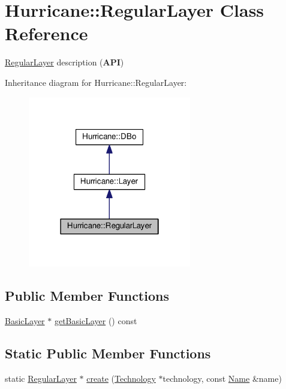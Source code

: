 \hypertarget{classHurricane_1_1RegularLayer}{}\section{Hurricane\+:\+:Regular\+Layer Class Reference}
\label{classHurricane_1_1RegularLayer}


\hyperlink{classHurricane_1_1RegularLayer}{Regular\+Layer} description ({\bfseries A\+PI})  




Inheritance diagram for Hurricane\+:\+:Regular\+Layer\+:\nopagebreak
\begin{figure}[H]
\begin{center}
\leavevmode
\includegraphics[width=202pt]{classHurricane_1_1RegularLayer__inherit__graph}
\end{center}
\end{figure}
\subsection*{Public Member Functions}
\begin{DoxyCompactItemize}
\item 
\hyperlink{classHurricane_1_1BasicLayer}{Basic\+Layer} $\ast$ \hyperlink{classHurricane_1_1RegularLayer_a148c5839b544c2a0aa5d25be5958dfaf}{get\+Basic\+Layer} () const
\end{DoxyCompactItemize}
\subsection*{Static Public Member Functions}
\begin{DoxyCompactItemize}
\item 
static \hyperlink{classHurricane_1_1RegularLayer}{Regular\+Layer} $\ast$ \hyperlink{classHurricane_1_1RegularLayer_a88c2d5516f42b033ae2fdc0797e3dae1}{create} (\hyperlink{classHurricane_1_1Technology}{Technology} $\ast$technology, const \hyperlink{classHurricane_1_1Name}{Name} \&name)
\end{DoxyCompactItemize}
